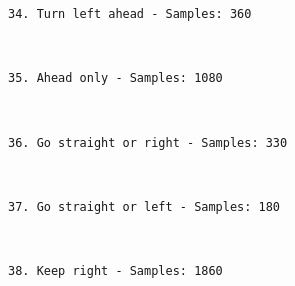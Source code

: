 \documentclass[11pt]{article}
\begin{document}
    \begin{Verbatim}[commandchars=\\\{\}]
34. Turn left ahead - Samples: 360

    \end{Verbatim}

    \begin{center}
    \end{center}
    { \hspace*{\fill} \\}
    
    \begin{Verbatim}[commandchars=\\\{\}]
35. Ahead only - Samples: 1080

    \end{Verbatim}

    \begin{center}
    \end{center}
    { \hspace*{\fill} \\}
    
    \begin{Verbatim}[commandchars=\\\{\}]
36. Go straight or right - Samples: 330

    \end{Verbatim}

    \begin{center}
    \end{center}
    { \hspace*{\fill} \\}
    
    \begin{Verbatim}[commandchars=\\\{\}]
37. Go straight or left - Samples: 180

    \end{Verbatim}

    \begin{center}
    \end{center}
    { \hspace*{\fill} \\}
    
    \begin{Verbatim}[commandchars=\\\{\}]
38. Keep right - Samples: 1860

    \end{Verbatim}
\end{document}
